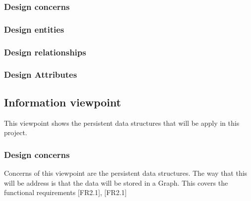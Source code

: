 \documentclass[12pt]{article}
\begin{document}
            \subsubsection{Design concerns}
            
            
            \subsubsection{Design entities}
            
            \subsubsection{Design relationships}
            
            \subsubsection{Design Attributes}
        
        \subsection{Information viewpoint}%
            This viewpoint shows the persistent data structures that will be apply in this project.
            \subsubsection{Design concerns}
                Concerns of this viewpoint are the persistent data structures. The way that this will be address is that the data will be stored in a Graph. This covers the functional requirements [FR2.1], [FR2.1]
            
\end{document}
